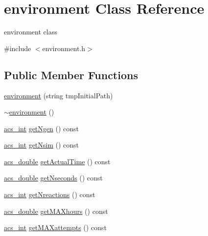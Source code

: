 \hypertarget{classenvironment}{\section{environment Class Reference}
\label{classenvironment}
}


environment class  




{\ttfamily \#include $<$environment.\-h$>$}

\subsection*{Public Member Functions}
\begin{DoxyCompactItemize}
\item 
\hyperlink{classenvironment_aa44bbabec52bf2d61a19685a30e68de1}{environment} (string tmp\-Initial\-Path)
\item 
\hyperlink{classenvironment_ae323954bd5b674bf34d954c3f7b67629}{$\sim$environment} ()
\item 
\hyperlink{acs__headers_8h_a8d277355641a098190360234e2ebde35}{acs\-\_\-int} \hyperlink{classenvironment_afad68362d5f4ec0689941e3c1b92c2e8}{get\-Ngen} () const 
\item 
\hyperlink{acs__headers_8h_a8d277355641a098190360234e2ebde35}{acs\-\_\-int} \hyperlink{classenvironment_a5a8522899b3e84b9c394d5d83d1e5c63}{get\-Nsim} () const 
\item 
\hyperlink{acs__headers_8h_ab776853a005fcbf56af0424a2a4dd607}{acs\-\_\-double} \hyperlink{classenvironment_a14bad649a73246617361f0e1765f49f8}{get\-Actual\-Time} () const 
\item 
\hyperlink{acs__headers_8h_ab776853a005fcbf56af0424a2a4dd607}{acs\-\_\-double} \hyperlink{classenvironment_aa850c2805e508b2aac4fbd5d5f9de77b}{get\-Nseconds} () const 
\item 
\hyperlink{acs__headers_8h_a8d277355641a098190360234e2ebde35}{acs\-\_\-int} \hyperlink{classenvironment_a5cb9cf3968f19e23f6c54f4c915cf878}{get\-Nreactions} () const 
\item 
\hyperlink{acs__headers_8h_ab776853a005fcbf56af0424a2a4dd607}{acs\-\_\-double} \hyperlink{classenvironment_af2b482132fc3ab299118f7a894bd53a2}{get\-M\-A\-Xhours} () const 
\item 
\hyperlink{acs__headers_8h_a8d277355641a098190360234e2ebde35}{acs\-\_\-int} \hyperlink{classenvironment_ae626b961a53eeb5e08b4190da235e8dd}{get\-M\-A\-Xattempts} () const 
\item 

\end{DoxyCompactItemize}
